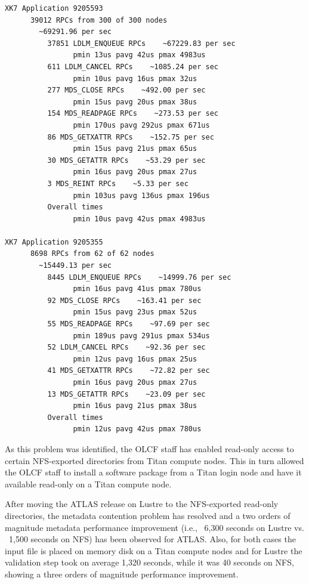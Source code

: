 \begin{lstlisting}[language=bash,frame=single,basicstyle=\ttfamily\tiny,caption=ATLAS metadata trace,label=mdstrace] 
XK7 Application 9205593
      39012 RPCs from 300 of 300 nodes
        ~69291.96 per sec
          37851 LDLM_ENQUEUE RPCs    ~67229.83 per sec
                pmin 13us pavg 42us pmax 4983us
          611 LDLM_CANCEL RPCs    ~1085.24 per sec
                pmin 10us pavg 16us pmax 32us
          277 MDS_CLOSE RPCs    ~492.00 per sec
                pmin 15us pavg 20us pmax 38us
          154 MDS_READPAGE RPCs    ~273.53 per sec
                pmin 170us pavg 292us pmax 671us
          86 MDS_GETXATTR RPCs    ~152.75 per sec
                pmin 15us pavg 21us pmax 65us
          30 MDS_GETATTR RPCs    ~53.29 per sec
                pmin 16us pavg 20us pmax 27us
          3 MDS_REINT RPCs    ~5.33 per sec
                pmin 103us pavg 136us pmax 196us
          Overall times
                pmin 10us pavg 42us pmax 4983us

XK7 Application 9205355
      8698 RPCs from 62 of 62 nodes
        ~15449.13 per sec
          8445 LDLM_ENQUEUE RPCs    ~14999.76 per sec
                pmin 16us pavg 41us pmax 780us
          92 MDS_CLOSE RPCs    ~163.41 per sec
                pmin 15us pavg 23us pmax 52us
          55 MDS_READPAGE RPCs    ~97.69 per sec
                pmin 189us pavg 291us pmax 534us
          52 LDLM_CANCEL RPCs    ~92.36 per sec
                pmin 12us pavg 16us pmax 25us
          41 MDS_GETXATTR RPCs    ~72.82 per sec
                pmin 16us pavg 20us pmax 27us
          13 MDS_GETATTR RPCs    ~23.09 per sec
                pmin 16us pavg 21us pmax 38us
          Overall times
                pmin 12us pavg 42us pmax 780us

\end{lstlisting}

As this problem was identified, the OLCF staff has enabled read-only access to
certain NFS-exported directories from Titan compute nodes. This in turn allowed
the OLCF staff to install a software package from a Titan login node and have
it available read-only on a Titan compute node.  

After moving the ATLAS release on Lustre to the NFS-exported read-only
directories, the metadata contention problem has resolved and a two orders of
magnitude metadata performance improvement (i.e., ~6,300 seconds on Lustre vs.
~1,500 seconds on NFS) has been observed for ATLAS.  Also, for both cases the
input file is placed on memory disk on a Titan compute nodes and for Lustre the
validation step took on average 1,320 seconds, while it was 40 seconds on NFS,
showing a three orders of magnitude performance improvement. 

